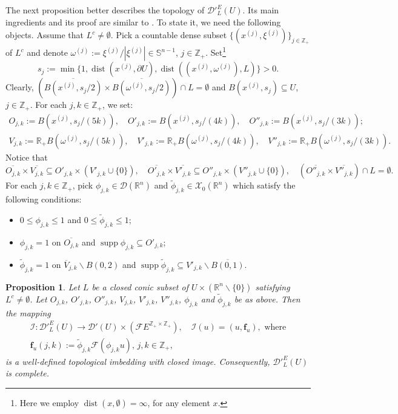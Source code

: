 \documentclass[12pt,reqno]{amsart}
\newcommand{\RR}{\mathbb R}
\newcommand{\ZZ}{\mathbb Z}
\newcommand{\DD}{\mathcal D}
\newcommand{\XX}{\mathcal X}
\newcommand{\supp}{\operatorname{supp}}
\theoremstyle{plain}
\newtheorem{proposition}[theorem]{Proposition}
\theoremstyle{remark}
\theoremstyle{definition}
\numberwithin{equation}{section}
\begin{document}
The next proposition better describes the topology of $\DD'^E_L(U)$. Its main ingredients and its proof are similar to \cite[Proposition 3.7]{PP}. To state it, we need the following objects. Assume that $L^c\neq \emptyset$. Pick a countable dense subset $\{(x^{(j)},\xi^{(j)})\}_{j\in\ZZ_+}$ of $L^c$ and denote $\omega^{(j)}:=\xi^{(j)}/|\xi^{(j)}|\in\mathbb{S}^{n-1}$, $j\in\ZZ_+$. Set\footnote{Here we employ $\operatorname{dist}(x,\emptyset)=\infty$, for any element $x$.}
$$
s_j:=\min\{1,\operatorname{dist}(x^{(j)},\partial U),\operatorname{dist}((x^{(j)},\omega^{(j)}),L)\}>0.
$$
Clearly, $(\overline{B(x^{(j)},s_j/2)}\times \overline{B(\omega^{(j)},s_j/2)})\cap L=\emptyset$ and $B(x^{(j)},s_j)\subseteq U$, $j\in\ZZ_+$. For each $j,k\in\ZZ_+$, we set:
\begin{gather*}
O_{j,k}:=B(x^{(j)},s_j/(5k)),\quad O'_{j,k}:=B(x^{(j)},s_j/(4k)),\quad O''_{j,k}:=B(x^{(j)},s_j/(3k));\\
V_{j,k}:=\RR_+ B(\omega^{(j)},s_j/(5k)),\quad V'_{j,k}:=\RR_+ B(\omega^{(j)},s_j/(4k)),\quad V''_{j,k}:=\RR_+ B(\omega^{(j)},s_j/(3k)).
\end{gather*}
Notice that
$$
\overline{O_{j,k}}\times \overline{V_{j,k}}\subseteq O'_{j,k}\times (V'_{j,k}\cup\{0\}),\quad \overline{O'_{j,k}}\times \overline{V'_{j,k}}\subseteq O''_{j,k}\times (V''_{j,k}\cup\{0\}),\quad (\overline{O''_{j,k}}\times \overline{V''_{j,k}})\cap L=\emptyset.
$$
For each $j,k\in\ZZ_+$, pick $\phi_{j,k}\in\DD(\RR^n)$ and $\widetilde{\phi}_{j,k}\in\XX_0(\RR^n)$ which satisfy the following conditions:
\begin{itemize}
\item[$(a)$] $0\leq \phi_{j,k}\leq 1$ and $0\leq \widetilde{\phi}_{j,k}\leq 1$;
\item[$(b)$] $\phi_{j,k}=1$ on $\overline{O_{j,k}}$ and $\supp\phi_{j,k}\subseteq O'_{j,k}$;
\item[$(c)$] $\widetilde{\phi}_{j,k}=1$ on $\overline{V}_{j,k}\backslash B(0,2)$ and $\supp\widetilde{\phi}_{j,k}\subseteq V'_{j,k}\backslash \overline{B(0,1)}$.
\end{itemize}

\begin{proposition}\label{pro-for-top-isk111}
Let $L$ be a closed conic subset of $U\times(\RR^n\backslash\{0\})$ satisfying $L^c\neq \emptyset$. Let $O_{j,k}$, $O'_{j,k}$, $O''_{j,k}$, $V_{j,k}$, $V'_{j,k}$, $V''_{j,k}$, $\phi_{j,k}$ and $\widetilde{\phi}_{j,k}$ be as above. Then the mapping
\begin{gather*}
\mathcal{I}:\DD'^E_L(U)\rightarrow \DD'(U)\times (\mathcal{F}E^{\ZZ_+\times \ZZ_+}),\quad \mathcal{I}(u)=(u,\mathbf{f}_u),\,\, \mbox{where}\\
\mathbf{f}_u(j,k):=\widetilde{\phi}_{j,k}\mathcal{F}(\phi_{j,k} u),\, j,k\in\ZZ_+,
\end{gather*}
is a well-defined topological imbedding with closed image. Consequently, $\DD'^E_L(U)$ is complete.
\end{proposition}
\end{document}
